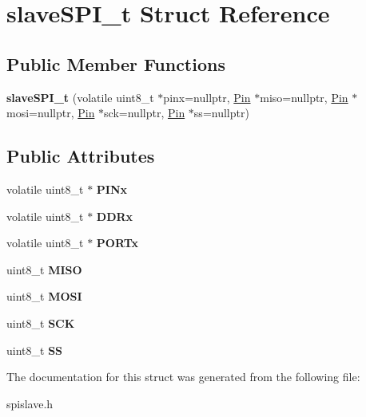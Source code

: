 \hypertarget{structslaveSPI__t}{}\section{slave\+S\+P\+I\+\_\+t Struct Reference}
\label{structslaveSPI__t}
\subsection*{Public Member Functions}
\begin{DoxyCompactItemize}
\item 
\mbox{\label{structslaveSPI__t_a1b6a92bfd0ff9f66643a2216703070fe}} 
{\bfseries slave\+S\+P\+I\+\_\+t} (volatile uint8\+\_\+t $\ast$pinx=nullptr, \mbox{\hyperlink{classPin}{Pin}} $\ast$miso=nullptr, \mbox{\hyperlink{classPin}{Pin}} $\ast$mosi=nullptr, \mbox{\hyperlink{classPin}{Pin}} $\ast$sck=nullptr, \mbox{\hyperlink{classPin}{Pin}} $\ast$ss=nullptr)
\end{DoxyCompactItemize}
\subsection*{Public Attributes}
\begin{DoxyCompactItemize}
\item 
\mbox{\label{structslaveSPI__t_a87109c268334437e6c10cde1a0ba03af}} 
volatile uint8\+\_\+t $\ast$ {\bfseries P\+I\+Nx}
\item 
\mbox{\label{structslaveSPI__t_a77665ecee539253948fc71839bc554e7}} 
volatile uint8\+\_\+t $\ast$ {\bfseries D\+D\+Rx}
\item 
\mbox{\label{structslaveSPI__t_a5588c63730f0f979979505bc9fd9c549}} 
volatile uint8\+\_\+t $\ast$ {\bfseries P\+O\+R\+Tx}
\item 
\mbox{\label{structslaveSPI__t_ad9840e1a743e4e44ceb98423dbf9e187}} 
uint8\+\_\+t {\bfseries M\+I\+SO}
\item 
\mbox{\label{structslaveSPI__t_afa1934adc11d621b99622b2c3d64f39c}} 
uint8\+\_\+t {\bfseries M\+O\+SI}
\item 
\mbox{\label{structslaveSPI__t_a9806668f14328150edfee7d9c9c50c16}} 
uint8\+\_\+t {\bfseries S\+CK}
\item 
\mbox{\label{structslaveSPI__t_a784ce6629767e64b0bbe7ffcf2937d52}} 
uint8\+\_\+t {\bfseries SS}
\end{DoxyCompactItemize}


The documentation for this struct was generated from the following file\+:\begin{DoxyCompactItemize}
\item 
spislave.\+h\end{DoxyCompactItemize}
